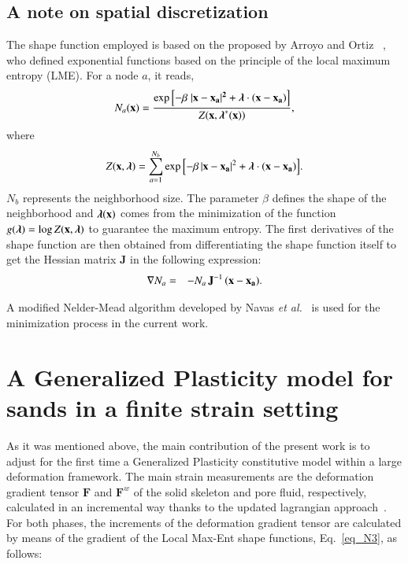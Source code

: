 \documentclass[preprint,12pt,a4paper]{elsarticle}
\begin{document}
\subsection{A note on spatial discretization}
\label{subsec:23}
The shape function employed is based on the proposed by Arroyo and Ortiz ~\cite{arroyo2006}, who defined exponential  functions based on the principle of  the local maximum entropy (LME).  For a node $a$, it reads,
\begin{equation} \label{eq_N1}
N_a(\textbf{x})=\frac{\exp\left[ -\beta \; |\bf x-x_a|^2 +  \boldsymbol{\lambda}  \cdot  (x-x_a)         \right] } {Z(\textbf{x},\boldsymbol{\lambda}^*(\textbf{x}))},
\end{equation}
where
\begin{equation}\label{eq_N2}
Z({\bf x}, {\boldsymbol{\lambda}}) = \sum_{a=1}^{N_b}{ \exp \left[ -\beta \, |{\bf x-x_a}|^2 + \boldsymbol{\lambda}  \cdot  \bf {(x-x_a)}         \right]}.
\end{equation}
$N_b$ represents the neighborhood size. The parameter $\beta$ defines the shape of the neighborhood and $\boldsymbol{\lambda}(\bf x)$ comes from the minimization of the function $g(\boldsymbol{\lambda})=\log Z(\bf x, \boldsymbol{\lambda})$ to guarantee the maximum entropy. The first derivatives of the shape function are then obtained from differentiating the shape function itself to get the Hessian matrix \textbf{J}  in the following expression:
\begin{eqnarray}
\nabla N_a &=& -N_a \,  \textbf{J}^{-1} \,  (\bf x-x_a) \label{eq_N3}.
\end{eqnarray}

A modified Nelder-Mead algorithm developed by Navas {\it et al.}~\cite{Navas2018} is used for the minimization process in the current work.
 
\section{A Generalized Plasticity model for sands in a finite strain setting  
}
\label{sec:3}
As it was mentioned above, the main contribution of the present work is to adjust for the first time a Generalized Plasticity constitutive model within a large deformation framework. The main strain measurements are the deformation gradient tensor $\mathbf{F}$ and $\mathbf{F}^w$ of the solid skeleton and pore fluid, respectively, calculated in an incremental way thanks to the updated lagrangian approach~\cite{Bonet2008}. For both phases, the increments of the deformation gradient tensor are calculated by means of the gradient of the Local Max-Ent shape functions, Eq.~\eqref{eq_N3}, as follows:
\end{document}
